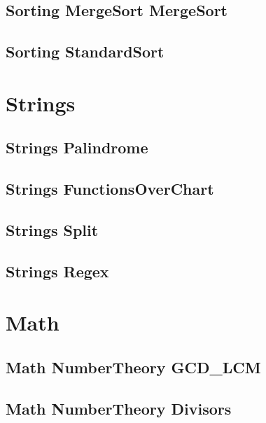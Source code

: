 \subsection{Sorting MergeSort MergeSort}
\raggedbottom
\hrulefill
\subsection{Sorting StandardSort}
\raggedbottom
\hrulefill

\section{Strings}
\subsection{Strings Palindrome}
\raggedbottom
\hrulefill
\subsection{Strings FunctionsOverChart}
\raggedbottom
\hrulefill
\subsection{Strings Split}
\raggedbottom
\hrulefill
\subsection{Strings Regex}
\raggedbottom
\hrulefill

\section{Math}
\subsection{Math NumberTheory GCD_LCM}
\raggedbottom
\hrulefill
\subsection{Math NumberTheory Divisors}
\raggedbottom
\hrulefill
